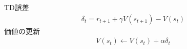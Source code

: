 TD誤差
$$
\begin{align}
\delta_{t} = r_{t+1} + \gamma V(s_{t+1}) - V(s_{t})
\end{align}
$$
価値の更新
$$
\begin{align}
V(s_{t}) \leftarrow V(s_{t}) + \alpha \delta_{t}
\end{align}
$$